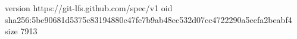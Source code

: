 version https://git-lfs.github.com/spec/v1
oid sha256:5be90681d5375c83194880c47fe7b9ab48ec532d07cc4722290a5eefa2beabf4
size 7913
